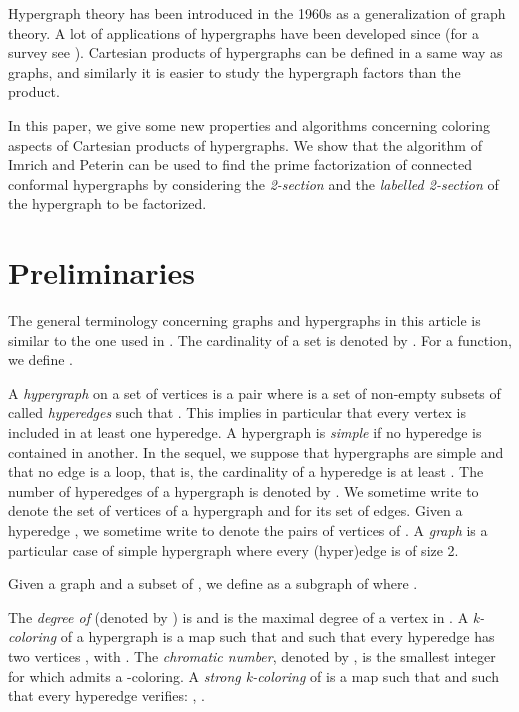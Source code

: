 \documentclass[copyright]{eptcs}
\newcommand{\chg}[1]{{#1}}
\begin{document}
Hypergraph theory has been introduced in the 1960s as a generalization of graph theory. A lot of applications of hypergraphs have been developed since (for a survey see \cite{Bretto}). Cartesian products of hypergraphs can be defined in a same way as graphs, and similarly it is easier to study the hypergraph factors than the product.

In this paper, we give some new properties and algorithms concerning coloring aspects of Cartesian products of hypergraphs.
We show that the algorithm of Imrich and Peterin \cite{ImPe} can be used to find the prime factorization of connected conformal hypergraphs by considering the \emph{2-section} and the \emph{labelled 2-section} of the hypergraph to be factorized.\\

\section{Preliminaries}
The general terminology concerning graphs and hypergraphs in this
article is similar to the one used in \cite{berge1,berge2}. The
cardinality of a set  is denoted by . For  a function,
we define .

A \emph{hypergraph}  on a set of vertices  is a pair 
where  is a set of non-empty subsets of  called
\emph{hyperedges} such that . This implies in
particular that every vertex is included in at least one
hyperedge. A hypergraph is \emph{simple} if no hyperedge is
contained in another. In the sequel, we suppose that hypergraphs
are simple and that no edge is a loop, that is, the cardinality of
a hyperedge is at least . The number of hyperedges of a
hypergraph  is denoted by . We sometime write 
to denote the set of vertices of a hypergraph and  for
its set of edges. Given a hyperedge , we sometime
write  to denote the pairs of vertices of . A
\emph{graph} is a particular case of simple hypergraph where every
(hyper)edge is of size 2.

\chg{Given a graph  and  a subset of , we
define  as a subgraph of  where . }


The \emph{ degree of}  (denoted by ) is  and
 is the maximal degree of a vertex in .
A \emph{k-coloring} of a hypergraph  is \chg{a map  such that  and  such that every hyperedge  has two vertices , with .} The
\emph{chromatic number}, denoted by , is the smallest
integer  for which  admits a -coloring. A \emph{strong
k-coloring} of  is \chg{{a map  such that  and such that every
hyperedge  verifies: , .}}
\end{document}
